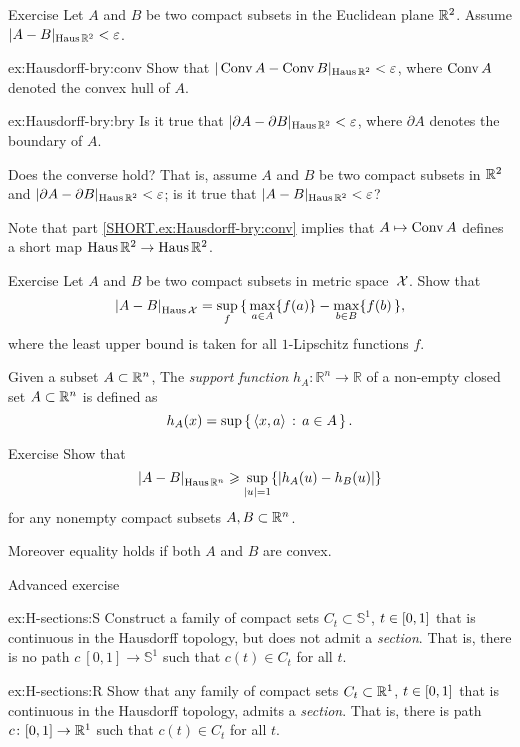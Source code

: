 \begin{thm}{Exercise}\label{ex:Hausdorff-bry}
Let $A$ and $B$ be two compact subsets in the Euclidean plane $\mathbb{R}^2$.
Assume $|A-B|_{\operatorname{\rm Haus}\nolimits\mathbb{R}^2}<\varepsilon$.

\begin{subthm}{ex:Hausdorff-bry:conv}
Show that $|\mathop{\rm Conv}\nolimits A-\mathop{\rm Conv}\nolimits B|_{\operatorname{\rm Haus}\nolimits\mathbb{R}^2}<\varepsilon$, where $\mathop{\rm Conv}\nolimits A$ denoted the convex hull of $A$.
\end{subthm}
\begin{subthm}{ex:Hausdorff-bry:bry}
Is it true that
$|\partial A-\partial B|_{\operatorname{\rm Haus}\nolimits\mathbb{R}^2}<\varepsilon$,
where $\partial A$ denotes the boundary of $A$.

Does the converse hold? That is, assume $A$ and $B$ be two compact subsets in $\mathbb{R}^2$
and $|\partial A-\partial B|_{\operatorname{\rm Haus}\nolimits\mathbb{R}^2}<\varepsilon$; 
is it true that $|A-B|_{\Haus\RR^2}\z<\eps$?
\end{subthm}

\end{thm}

Note that part \ref{SHORT.ex:Hausdorff-bry:conv} implies that $A\mapsto \mathop{\rm Conv}\nolimits A$ defines a short map $\operatorname{\rm Haus}\nolimits\mathbb{R}^2\to \operatorname{\rm Haus}\nolimits\mathbb{R}^2$. 

\begin{thm}{Exercise}\label{ex:Haus-func}
Let $A$ and $B$ be two compact subsets in metric space~$\mathcal{X}$.
Show that 
\[\dist{A}{B}{\Haus\spc{X}}=\sup_f\, \{\,\max_{a\in A}\{f(a)\}-\max_{b\in B}\{f(b)\,\},\]
where the least upper bound is taken for all $1$-Lipschitz functions $f$.

\end{thm}

Given a subset $A\subset \mathbb{R}^n$,
The \emph{support function} $h_A\colon\mathbb{R}^n\to\mathbb{R}$ of a  non-empty closed set $A\subset \mathbb{R}^n$ is defined as 
\[h_A(x)=\sup\left\{\,{\langle x, a\rangle}\,:\,{a\in A}\,\right\}.\]

\begin{thm}{Exercise}\label{ex:Haus-support}
Show that 
\[\dist{A}{B}{\Haus\RR^n}\ge \sup_{|u|=1}\{|h_A(u)-h_B(u)|\}\]
for any nonempty compact subsets $A,B\subset \mathbb{R}^n$.

Moreover equality holds if both $A$ and $B$ are convex.
\end{thm}


\begin{thm}{Advanced exercise}\label{ex:H-sections}
\begin{subthm}{ex:H-sections:S}
Construct a family of compact sets $C_t\subset\mathbb{S}^1$, $t\z\in [0,1]$ that is continuous in the Hausdorff topology, 
but does not admit a {}\emph{section}.
That is, there is no path $c\:[0,1]\to \mathbb{S}^1$ such that $c(t)\in C_t$ for all $t$.
\end{subthm}

\begin{subthm}{ex:H-sections:R}
Show that any family of compact sets $C_t\subset\mathbb{R}^1$, $t\z\in [0,1]$ that is continuous in the Hausdorff topology, 
admits a {}\emph{section}.
That is, there is path $c\colon[0,1]\to \mathbb{R}^1$ such that $c(t)\in C_t$ for all $t$.
\end{subthm}

\end{thm}

